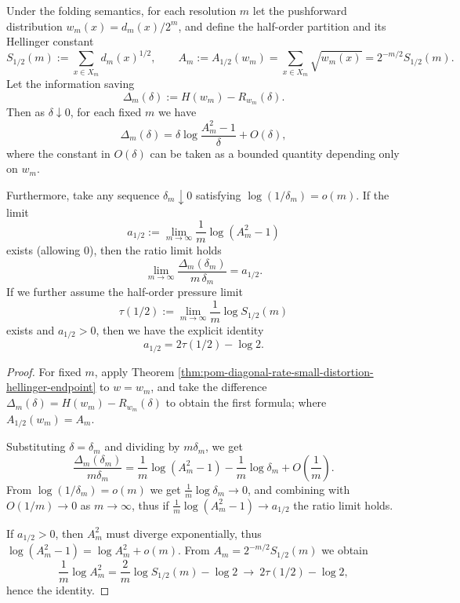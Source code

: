 
\begin{corollary}[Small Distortion Saving Law under Folding Semantics: Leading-Order Slope Constant of \texorpdfstring{$q=\tfrac12$}{q=1/2} Partition]\label{cor:pom-diagonal-rate-small-distortion-saving-half-moment-fold}
Under the folding semantics, for each resolution \(m\) let the pushforward distribution \(w_m(x)=d_m(x)/2^m\), and define the half-order partition and its Hellinger constant
\[
S_{1/2}(m):=\sum_{x\in X_m} d_m(x)^{1/2},\qquad
A_m:=A_{1/2}(w_m)=\sum_{x\in X_m}\sqrt{w_m(x)}=2^{-m/2}S_{1/2}(m).
\]
Let the information saving
\[
\Delta_m(\delta):=H(w_m)-R_{w_m}(\delta).
\]
Then as \(\delta\downarrow 0\), for each fixed \(m\) we have
\[
\Delta_m(\delta)=\delta\log\frac{A_m^2-1}{\delta}+O(\delta),
\]
where the constant in \(O(\delta)\) can be taken as a bounded quantity depending only on \(w_m\).
\par
Furthermore, take any sequence \(\delta_m\downarrow 0\) satisfying \(\log(1/\delta_m)=o(m)\).
If the limit
\[
a_{1/2}:=\lim_{m\to\infty}\frac{1}{m}\log(A_m^2-1)
\]
exists (allowing \(0\)), then the ratio limit holds
\[
\lim_{m\to\infty}\frac{\Delta_m(\delta_m)}{m\,\delta_m}=a_{1/2}.
\]
If we further assume the half-order pressure limit
\[
\tau(1/2):=\lim_{m\to\infty}\frac{1}{m}\log S_{1/2}(m)
\]
exists and \(a_{1/2}>0\), then we have the explicit identity
\[
a_{1/2}=2\tau(1/2)-\log 2.
\]
\end{corollary}
\begin{proof}
For fixed \(m\), apply Theorem \ref{thm:pom-diagonal-rate-small-distortion-hellinger-endpoint} to \(w=w_m\), and take the difference
\(
\Delta_m(\delta)=H(w_m)-R_{w_m}(\delta)
\)
to obtain the first formula; where \(A_{1/2}(w_m)=A_m\).
\par
Substituting \(\delta=\delta_m\) and dividing by \(m\delta_m\), we get
\[
\frac{\Delta_m(\delta_m)}{m\delta_m}
=\frac{1}{m}\log(A_m^2-1)-\frac{1}{m}\log\delta_m+O\!\left(\frac{1}{m}\right).
\]
From \(\log(1/\delta_m)=o(m)\) we get \(\frac{1}{m}\log\delta_m\to 0\), and combining with \(O(1/m)\to 0\) as \(m\to\infty\), thus if \(\frac{1}{m}\log(A_m^2-1)\to a_{1/2}\) the ratio limit holds.
\par
If \(a_{1/2}>0\), then \(A_m^2\) must diverge exponentially, thus
\(
\log(A_m^2-1)=\log A_m^2+o(m)
\).
From \(A_m=2^{-m/2}S_{1/2}(m)\) we obtain
\[
\frac{1}{m}\log A_m^2
=\frac{2}{m}\log S_{1/2}(m)-\log 2
\ \longrightarrow\ 2\tau(1/2)-\log 2,
\]
hence the identity.
\end{proof}

